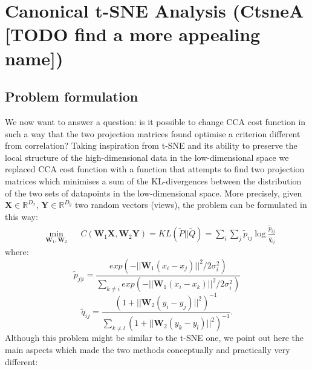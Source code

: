 \documentclass[11pt]{article}
\begin{document}
\section{Canonical t-SNE Analysis (CtsneA [TODO find a more appealing name])} 
\subsection{Problem formulation}
We now want to answer a question: is it possible to change CCA cost function in such a way that the two projection matrices found optimise a criterion different from correlation?
Taking inspiration from t-SNE and its ability to preserve the local structure of the high-dimensional data in the low-dimensional space we replaced CCA cost function with a function that attempts to find two projection matrices which minimises a sum of the KL-divergences between the distribution of the two sets of datapoints in the low-dimensional space. More precisely, given $\mathbf{X}\in \mathbb{R}^{D_x}$, $\mathbf{Y}\in \mathbb{R}^{D_y} $ two random vectors (views), the problem can be formulated in this way:
 \begin{equation}\label{ctnsea}
\begin{aligned}
& \underset{\mathbf{W}_1,\mathbf{W}_2}{\text{min}}
&& { {C(\mathbf{W}_1 \mathbf{X},{\mathbf{W}_2 \mathbf{Y}})}={\displaystyle KL(\tilde{P}||\tilde{Q})=\sum _i \sum_j\tilde{p}_{ij}\log {\frac {\tilde{p}_{ij}}{\tilde{q}_{ij}}}}
}
\end{aligned}
\end{equation}
where:
\begin{equation}
\tilde{p}_{j|i}=\frac{exp ( - || {\mathbf{W}_1}(x_i - x_j) ||^2 / 2\sigma_i ^2) }{\sum_{k \neq i} exp(-|| {\mathbf{W}_1} (x_i - x_k )||^2 / 2\sigma_i ^2 )}
\end{equation}
\begin{equation}
\tilde{q}_{ij}=\frac{(1+||\mathbf{W}_2(y_i - y_j) ||^2)^{-1}}{\sum_{k \neq l} (1+|| \mathbf{W}_2(y_k - y_l )||^2 )^{-1}}.
\end{equation}
Although this problem might be similar to the t-SNE one, we point out here the main aspects which made the two methods conceptually and practically very different:
\end{document}
